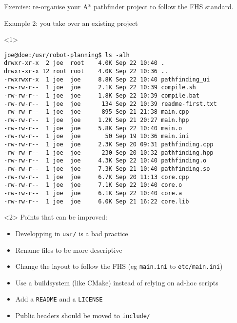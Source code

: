 \documentclass[compress]{beamer}
\begin{document}
\begin{frame}[plain]
\begin{center}
    \Large
    Exercise: re-organise your A* pathfinder project to follow the FHS standard.
\end{center}
\end{frame}

\begin{frame}[fragile]{Example 2: you take over an existing project}


\begin{onlyenv}<1>
\begin{verbatim}
joe@doe:/usr/robot-planning$ ls -alh
drwxr-xr-x  2 joe  root    4.0K Sep 22 10:40 .
drwxr-xr-x 12 root root    4.0K Sep 22 10:36 ..
-rwxrwxr-x  1 joe  joe     8.8K Sep 22 10:40 pathfinding_ui
-rw-rw-r--  1 joe  joe     2.1K Sep 22 10:39 compile.sh
-rw-rw-r--  1 joe  joe     1.8K Sep 22 10:39 compile.bat
-rw-rw-r--  1 joe  joe      134 Sep 22 10:39 readme-first.txt
-rw-rw-r--  1 joe  joe      895 Sep 21 21:38 main.cpp
-rw-rw-r--  1 joe  joe     1.2K Sep 21 20:27 main.hpp
-rw-rw-r--  1 joe  joe     5.8K Sep 22 10:40 main.o
-rw-rw-r--  1 joe  joe       50 Sep 19 10:36 main.ini
-rw-rw-r--  1 joe  joe     2.3K Sep 20 09:31 pathfinding.cpp
-rw-rw-r--  1 joe  joe      230 Sep 20 10:32 pathfinding.hpp
-rw-rw-r--  1 joe  joe     4.3K Sep 22 10:40 pathfinding.o
-rw-rw-r--  1 joe  joe     7.3K Sep 21 10:40 pathfinding.so
-rw-rw-r--  1 joe  joe     6.7K Sep 20 11:13 core.cpp
-rw-rw-r--  1 joe  joe     7.1K Sep 22 10:40 core.o
-rw-rw-r--  1 joe  joe     6.1K Sep 22 10:40 core.a
-rw-rw-r--  1 joe  joe     6.0K Sep 21 16:22 core.lib
\end{verbatim}

\end{onlyenv}

    \begin{onlyenv}<2>
        Points that can be improved:

        \begin{itemize}
            \item Developping in \texttt{usr/} is a bad practice
            \item Rename files to be more descriptive
            \item Change the layout to follow the FHS (eg \texttt{main.ini} to
                \texttt{etc/main.ini})
            \item Use a buildsystem (like CMake) instead of relying on ad-hoc scripts
            \item Add a \texttt{README} and a \texttt{LICENSE}
            \item Public headers should be moved to \texttt{include/}
        \end{itemize}
    \end{onlyenv}
\end{frame}
\end{document}
